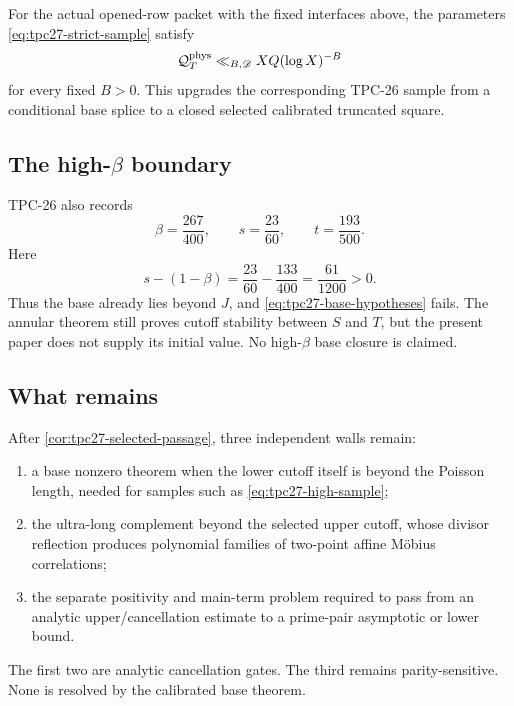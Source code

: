 \begin{corollary}
\label{cor:tpc27-strict-sample}
For the actual opened-row packet with the fixed interfaces above, the
parameters \eqref{eq:tpc27-strict-sample} satisfy
\begin{equation}
 \mathcal Q_T^{\rm phys}
 \ll_{B,\mathscr D}XQ(\log X)^{-B}
 \label{eq:tpc27-strict-sample-closure}
\end{equation}
for every fixed \(B>0\).  This upgrades the corresponding TPC-26
sample from a conditional base splice to a closed selected calibrated
truncated square.
\end{corollary}

\subsection{The high-\texorpdfstring{\(\beta\)}{beta} boundary}

TPC-26 also records
\begin{equation}
 \beta=\frac{267}{400},
 \qquad
 s=\frac{23}{60},
 \qquad
 t=\frac{193}{500}.
 \label{eq:tpc27-high-sample}
\end{equation}
Here
\begin{equation}
 s-(1-\beta)
 =\frac{23}{60}-\frac{133}{400}
 =\frac{61}{1200}>0.
 \label{eq:tpc27-high-base-beyond-J}
\end{equation}
Thus the base already lies beyond \(J\), and
\eqref{eq:tpc27-base-hypotheses} fails.  The annular theorem still
proves cutoff stability between \(S\) and \(T\), but the present paper
does not supply its initial value.  No high-\(\beta\) base closure is
claimed.

\subsection{What remains}

After \cref{cor:tpc27-selected-passage}, three independent walls remain:
\begin{enumerate}[label=\textup{(\roman*)}]
 \item a base nonzero theorem when the lower cutoff itself is beyond
 the Poisson length, needed for samples such as
 \eqref{eq:tpc27-high-sample};
 \item the ultra-long complement beyond the selected upper cutoff,
 whose divisor reflection produces polynomial families of two-point
 affine M\"obius correlations;
 \item the separate positivity and main-term problem required to pass
 from an analytic upper/cancellation estimate to a prime-pair
 asymptotic or lower bound.
\end{enumerate}
The first two are analytic cancellation gates.  The third remains
parity-sensitive.  None is resolved by the calibrated base theorem.
